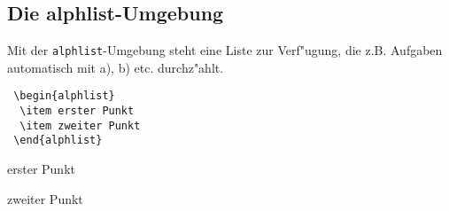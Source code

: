 \documentclass[a4paper,10pt,headsepline]{scrartcl}
\begin{document}
\subsection{Die {\ttfamily alphlist}-Umgebung}
Mit der \texttt{alphlist}-Umgebung steht eine Liste zur Verf"ugung, die z.B. Aufgaben automatisch mit a), b) etc. durchz"ahlt.
\begin{lstlisting}
 \begin{alphlist}
  \item erster Punkt
  \item zweiter Punkt
 \end{alphlist}
\end{lstlisting}
\begin{alphlist}
 \item erster Punkt
 \item zweiter Punkt
\end{alphlist}
\end{document}
